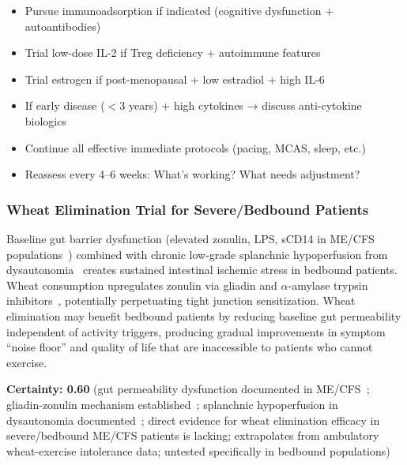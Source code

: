 \begin{itemize}
    \item[$\square$] Pursue immunoadsorption if indicated (cognitive dysfunction + autoantibodies)
    \item[$\square$] Trial low-dose IL-2 if Treg deficiency + autoimmune features
    \item[$\square$] Trial estrogen if post-menopausal + low estradiol + high IL-6
    \item[$\square$] If early disease ($<$3 years) + high cytokines → discuss anti-cytokine biologics
    \item[$\square$] Continue all effective immediate protocols (pacing, MCAS, sleep, etc.)
    \item[$\square$] Reassess every 4--6 weeks: What's working? What needs adjustment?
\end{itemize}

\subsubsection{Wheat Elimination Trial for Severe/Bedbound Patients}

\begin{hypothesis}
\label{hyp:wheat-elimination-bedbound}
Baseline gut barrier dysfunction (elevated zonulin, LPS, sCD14 in ME/CFS populations~\cite{GutPermeability2023}) combined with chronic low-grade splanchnic hypoperfusion from dysautonomia~\cite{vanWijck2011} creates sustained intestinal ischemic stress in bedbound patients. Wheat consumption upregulates zonulin via gliadin and $\alpha$-amylase trypsin inhibitors~\cite{Junker2012}, potentially perpetuating tight junction sensitization. Wheat elimination may benefit bedbound patients by reducing baseline gut permeability independent of activity triggers, producing gradual improvements in symptom ``noise floor'' and quality of life that are inaccessible to patients who cannot exercise.

\textbf{Certainty: 0.60} (gut permeability dysfunction documented in ME/CFS~\cite{GutPermeability2023}; gliadin-zonulin mechanism established~\cite{Junker2012}; splanchnic hypoperfusion in dysautonomia documented~\cite{vanWijck2011}; direct evidence for wheat elimination efficacy in severe/bedbound ME/CFS patients is lacking; extrapolates from ambulatory wheat-exercise intolerance data; untested specifically in bedbound populations)
\end{hypothesis}

